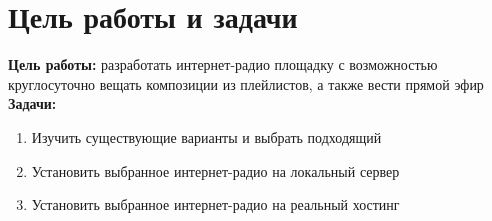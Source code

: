 \chapter{Цель работы и задачи}

\textbf{Цель работы:} разработать интернет-радио площадку с возможностью круглосуточно вещать композиции из плейлистов, а также вести прямой эфир\\


\textbf{Задачи: }
\begin{enumerate}
  \item Изучить существующие варианты и выбрать подходящий
  \item Установить выбранное интернет-радио на локальный сервер
  \item Установить выбранное интернет-радио на реальный хостинг
\end{enumerate}